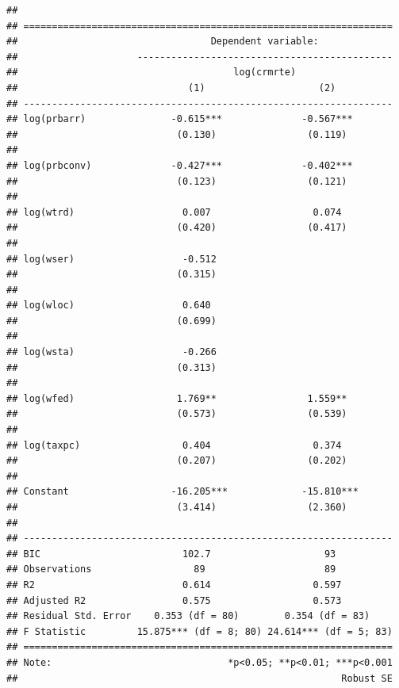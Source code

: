 \documentclass[]{article}
\begin{document}
\begin{verbatim}
## 
## =================================================================
##                                  Dependent variable:             
##                     ---------------------------------------------
##                                      log(crmrte)                 
##                              (1)                    (2)          
## -----------------------------------------------------------------
## log(prbarr)               -0.615***              -0.567***       
##                            (0.130)                (0.119)        
##                                                                  
## log(prbconv)              -0.427***              -0.402***       
##                            (0.123)                (0.121)        
##                                                                  
## log(wtrd)                   0.007                  0.074         
##                            (0.420)                (0.417)        
##                                                                  
## log(wser)                   -0.512                               
##                            (0.315)                               
##                                                                  
## log(wloc)                   0.640                                
##                            (0.699)                               
##                                                                  
## log(wsta)                   -0.266                               
##                            (0.313)                               
##                                                                  
## log(wfed)                  1.769**                1.559**        
##                            (0.573)                (0.539)        
##                                                                  
## log(taxpc)                  0.404                  0.374         
##                            (0.207)                (0.202)        
##                                                                  
## Constant                  -16.205***             -15.810***      
##                            (3.414)                (2.360)        
##                                                                  
## -----------------------------------------------------------------
## BIC                         102.7                    93          
## Observations                  89                     89          
## R2                          0.614                  0.597         
## Adjusted R2                 0.575                  0.573         
## Residual Std. Error    0.353 (df = 80)        0.354 (df = 83)    
## F Statistic         15.875*** (df = 8; 80) 24.614*** (df = 5; 83)
## =================================================================
## Note:                               *p<0.05; **p<0.01; ***p<0.001
##                                                         Robust SE
\end{verbatim}
\end{document}
